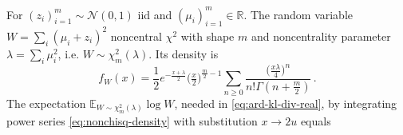 \documentclass[a4paper,10pt]{article}
\begin{document}
For $(z_i)_{i=1}^m \sim \mathcal{N}(0, 1)$ iid and $
  (\mu_i)_{i=1}^m \in \mathbb{R}
$. The random variable $W = \sum_i (\mu_i + z_i)^2$ noncentral $\chi^2$ with shape $m$
and noncentrality parameter $\lambda = \sum_i \mu_i^2$, i.e. $W\sim \chi^2_m(\lambda)$.
Its density is
\begin{equation}  \label{eq:nonchisq-density}
  f_W(x)
    = \frac12 e^{- \tfrac{x + \lambda}2} \bigl(\tfrac{x}2\bigr)^{\tfrac{m}2 - 1}
      \sum_{n \geq 0} \frac{
        \bigl(\tfrac{x \lambda}4\bigr)^n
      }{
        n! \Gamma(n + \tfrac{m}2)
      }
    \,.
\end{equation}
The expectation $
  \mathbb{E}_{W\sim \chi^2_m(\lambda)} \log W
$, needed in \eqref{eq:ard-kl-div-real}, by integrating power series \eqref{eq:nonchisq-density}
with substitution $x \to 2u$ equals
\end{document}

